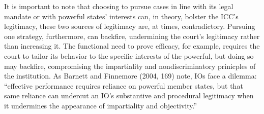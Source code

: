 It is important to note that choosing to pursue cases in line with its legal mandate or with powerful states' interests can, in theory, bolster the ICC's legitimacy, these two sources of legitimacy are, at times, contradictory.  Pursuing one strategy, furthermore, can backfire, undermining the court's legitimacy rather than increasing it.  The functional need to prove efficacy, for example, requires the court to tailor its behavior to the specific interests of the powerful, but doing so may backfire, compromising the impartiality and nondiscriminatory prinicples of the institution.  As Barnett and Finnemore (2004, 169) note, IOs face a dilemma: ``effective performance requires reliance on powerful member states, but that same reliance can undercut an IO's substantive and procedural legitimacy when it undermines the appearance of impartiality and objectivity.'' 
